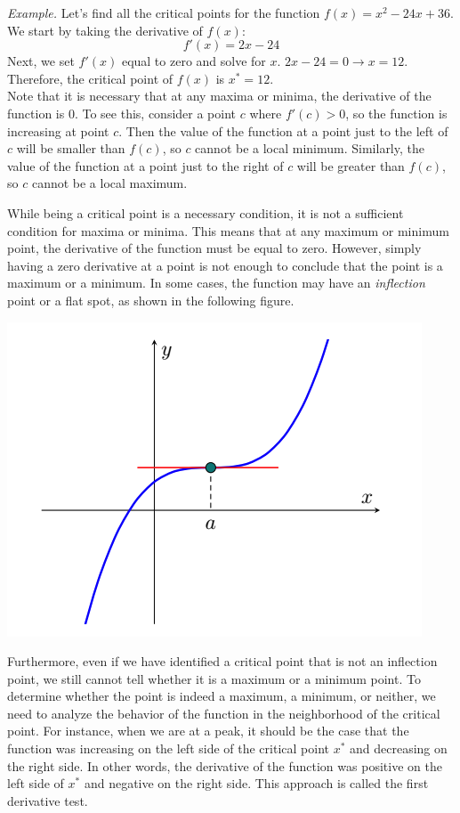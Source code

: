 \documentclass{./../Latex/handout}
\begin{document}
\noindent\textit{Example.} Let's find all the critical points for the function $f(x) = x^2 -24 x + 36 $. \\
We start by taking the derivative of $f(x)$: $$f'(x) = 2x-24$$
Next, we set $f'(x)$ equal to zero and solve for $x$. $2x-24=0 \rightarrow x =12$. Therefore, the critical point of $f(x)$ is $x^* = 12$.   \\

Note that it is necessary that at any maxima or minima, the derivative of the function is 0. To see this, consider a point $c$ where $f'(c)>0$, so the function is increasing at point $c$. Then the value of the function at a point just to the left of $c$ will be smaller than $f(c)$, so $c$ cannot be a local minimum. Similarly, the value of the function at a point just to the right of $c$ will be greater than $f(c)$, so $c$ cannot be a local maximum. 

While being a critical point is a necessary condition, it is not a sufficient condition for maxima or minima. This means that at any maximum or minimum point, the derivative of the function must be equal to zero. However, simply having a zero derivative at a point is not enough to conclude that the point is a maximum or a minimum. In some cases, the function may have an \textit{inflection} point or a flat spot, as shown in the following figure.

\begin{center}
\includegraphics[scale=0.55]{./Input/inflection.png} \\
\end{center} 

Furthermore, even if we have identified a critical point that is not an inflection point, we still cannot tell whether it is a maximum or a minimum point. To determine whether the point is indeed a maximum, a minimum, or neither, we need to analyze the behavior of the function in the neighborhood of the critical point. For instance, when we are at a peak, it should be the case that the function was increasing on the left side of the critical point $x^*$ and decreasing on the right side. In other words, the derivative of the function was positive on the left side of $x^*$ and negative on the right side. This approach is called the first derivative test. \\
\end{document}
